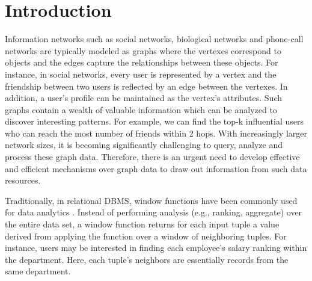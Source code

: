 \section{Introduction}
Information networks such as social networks, 
biological networks and phone-call networks are 
typically modeled as graphs \cite{chen2008graph}
where the vertexes correspond to objects and the edges
capture the relationships between these objects.
For instance, in social networks, every user is represented by
a vertex and the friendship between two users is reflected by an edge between
the vertexes. In addition, a user's profile can be maintained as
the vertex's attributes. Such graphs contain a wealth of valuable 
information which can be analyzed to discover interesting patterns. 
For example, we can find the top-k influential users who can 
reach the most number of friends within 2 hops. With increasingly
larger network sizes, it is becoming significantly challenging to 
query, analyze and process these graph data. Therefore, there is an urgent need 
to develop effective and efficient mechanisms over graph data to draw out
information from such data resources.
 
Traditionally, in relational DBMS, window functions have been commonly
used for data analytics \cite{cao2012optimization, bellamkonda2013adaptive}. 
Instead of performing analysis (e.g., ranking, aggregate) over the entire data set, 
a window function returns for each input tuple a value derived from applying the function over a window of 
neighboring tuples. For instance, users may be interested in finding 
each employee's salary ranking within the department. Here,
each tuple's neighbors are essentially records from the same department.


